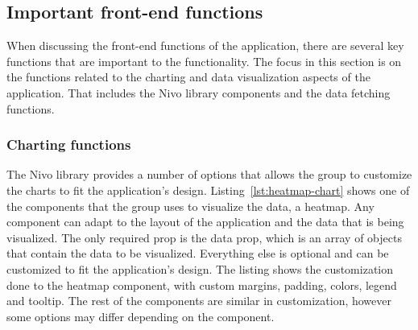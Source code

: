 \subsection{Important front-end functions}\label{subsec:important-front-end-functions}

When discussing the front-end functions of the application, there are several key functions that are important to the
functionality.
The focus in this section is on the functions related to the charting and data visualization aspects of the application.
That includes the Nivo library components and the data fetching functions.

\subsubsection{Charting functions}\label{subsubsec:charting-functions}

The Nivo library provides a number of options that allows the group to customize the charts to fit the application's
design.
Listing~\ref{lst:heatmap-chart} shows one of the components that the group uses to visualize the data, a heatmap.
Any component can adapt to the layout of the application and the data that is being visualized.
The only required prop is the data prop, which is an array of objects that contain the data to be visualized.
Everything else is optional and can be customized to fit the application's design.
The listing shows the customization done to the heatmap component, with custom margins, padding, colors, legend and 
tooltip.
The rest of the components are similar in customization, however some options may differ depending on the component.

